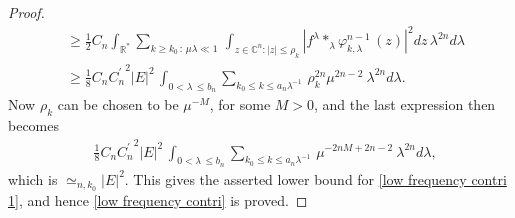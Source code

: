 \documentclass[11pt, reqno]{amsart}
\theoremstyle{plain}
\newcommand{\R}{\ensuremath{\mathbb{R_+}}}
\theoremstyle{remark}
\theoremstyle{example}
\theoremstyle{definition}
\numberwithin{equation}{section}
\def\R{\mathbb{R}}
\newcommand{\Ca}{\mathbb{C}^n}
\begin{document}
\begin{proof}
\begin{equation*}
    \begin{split}
      & \geq \frac{1}{2} C_{n} \int_{\R^{*}} \sum_{ k \geq k_{0} \, : \,  \mu \lambda \ll 1  } \,   \int_{z \in \Ca : |z | \leq \rho_{k}} |f^{\lambda} \ast_{\lambda} \varphi_{k, \lambda}^{n-1} \, (z)|^2 dz \, \lambda^{2n} d\lambda   \\
       & \geq \frac18 C_{n}{C_n^{\prime}}^2 |E|^2 \,   \int_{0 <\lambda \,  \leq  b_n} \sum_{k_{0} \leq  k \leq a_{n} \lambda^{-1}   } \,   \rho_{k}^{2n} \mu^{2n-2} \ \lambda^{2n} d\lambda.
    \end{split}
\end{equation*}
Now $\rho_{k}$ can be chosen to be $\mu^{-M}$, for some $M>0$, and the last expression then becomes
\begin{equation*}
    \begin{split}       
       &  \frac18 C_{n}{C_n^{\prime}}^2 |E|^2 \,   \int_{0 <\lambda \,  \leq  b_n} \sum_{k_{0} \leq  k \leq a_{n} \lambda^{-1}   } \,  \mu^{-2n M + 2n-2} \ \lambda^{2n} d\lambda,
\end{split}
\end{equation*}
which is $\simeq_{n, k_{0}} |E|^2$. This gives the asserted lower bound for \eqref{low frequency contri 1}, and hence \eqref{low frequency contri} is proved. 


\end{proof}
\end{document}

